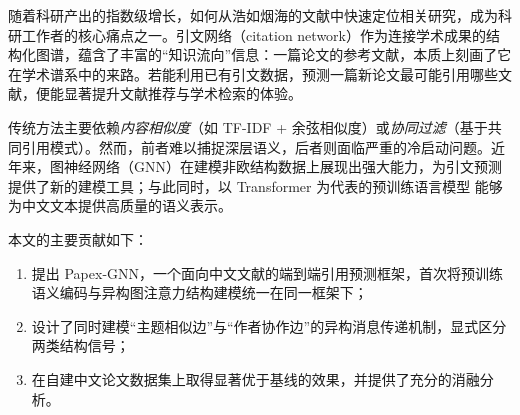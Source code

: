 随着科研产出的指数级增长，如何从浩如烟海的文献中快速定位相关研究，成为科研工作者的核心痛点之一。引文网络（citation network）作为连接学术成果的结构化图谱，蕴含了丰富的“知识流向”信息：一篇论文的参考文献，本质上刻画了它在学术谱系中的来路。若能利用已有引文数据，预测一篇新论文最可能引用哪些文献，便能显著提升文献推荐与学术检索的体验。

传统方法主要依赖\emph{内容相似度}（如 TF-IDF + 余弦相似度）或\emph{协同过滤}（基于共同引用模式）\cite{kipf2017}。然而，前者难以捕捉深层语义，后者则面临严重的冷启动问题。近年来，图神经网络（GNN）在建模非欧结构数据上展现出强大能力\cite{wang2019}，为引文预测提供了新的建模工具；与此同时，以 Transformer 为代表的预训练语言模型\cite{vaswani2017,devlin2019} 能够为中文文本提供高质量的语义表示。

本文的主要贡献如下：

\begin{enumerate}
  \item 提出 Papex-GNN，一个面向中文文献的端到端引用预测框架，首次将预训练语义编码与异构图注意力结构建模统一在同一框架下；
  \item 设计了同时建模“主题相似边”与“作者协作边”的异构消息传递机制，显式区分两类结构信号；
  \item 在自建中文论文数据集上取得显著优于基线的效果，并提供了充分的消融分析。
\end{enumerate}
